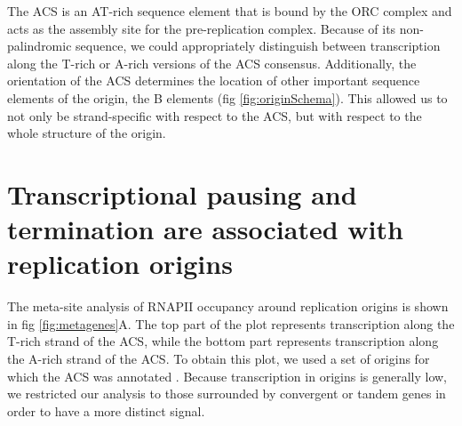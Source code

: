 The ACS is an AT-rich sequence element that is bound by the ORC complex and acts as the assembly site for the pre-replication complex. Because of its non-palindromic sequence, we could appropriately distinguish between transcription along the T-rich or A-rich versions of the ACS consensus. Additionally, the orientation of the ACS determines the location of other important sequence elements of the origin, the B elements (fig \ref{fig:originSchema}). This allowed us to not only be strand-specific with respect to the ACS, but with respect to the whole structure of the origin. 

\singlespacing
\section{Transcriptional pausing and termination are associated with replication origins}
\doublespacing

The meta-site analysis of RNAPII occupancy around replication origins is shown in fig \ref{fig:metagenes}A. The top part of the plot represents transcription along the T-rich strand of the ACS, while the bottom part represents transcription along the A-rich strand of the ACS. To obtain this plot, we used a set of origins for which the ACS was annotated \cite{nieduszynski:2006:genomewide}. Because transcription in origins is generally low, we restricted our analysis to those surrounded by convergent or tandem genes in order to have a more distinct signal. 




